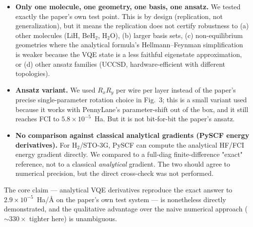 \documentclass[11pt]{article}
\begin{document}
\begin{itemize}
we cannot test on \texttt{default.qubit}. However, our numerical-difference approach still fails on
the noiseless simulator, because the true $\Delta E$ at $r=0.735$~\AA{} is $\sim 10^{-6}$~Ha, below
VQE convergence noise $\sim 5\times10^{-5}$~Ha. So the failure mode we observe (finite-step vs
VQE-convergence tension) is closely related to but not identical to the paper's motivating regime
(finite-step vs shot noise). Both flavors of noise dominate the gradient signal; ours is the
easier-to-simulate stand-in.
\item \textbf{Only one molecule, one geometry, one basis, one ansatz.} We tested exactly the paper's
own test point. This is by design (replication, not generalization), but it means the replication
does not certify robustness to (a) other molecules (LiH, BeH$_2$, H$_2$O), (b) larger basis sets,
(c) non-equilibrium geometries where the analytical formula's Hellmann--Feynman simplification is
weaker because the VQE state is a less faithful eigenstate approximation, or (d) other ansatz
families (UCCSD, hardware-efficient with different topologies).
\item \textbf{Ansatz variant.} We used $R_x R_y$ per wire per layer instead of the paper's precise
single-parameter rotation choice in Fig.~3; this is a small variant used because it works with
PennyLane's parameter-shift out of the box, and it still reaches FCI to $5.8\times10^{-5}$~Ha. But
it is not bit-for-bit the paper's ansatz.
\item \textbf{No comparison against classical analytical gradients (PySCF energy derivatives).}
For H$_2$/STO-3G, PySCF can compute the analytical HF/FCI energy gradient directly. We compared to
a full-diag finite-difference "exact" reference, not to a classical \emph{analytical} gradient. The
two should agree to numerical precision, but the direct cross-check was not performed.
\end{itemize}

The core claim --- analytical VQE derivatives reproduce the exact answer to $2.9\times10^{-5}$~Ha/\AA{}
on the paper's own test system --- is nonetheless directly demonstrated, and the qualitative
advantage over the naive numerical approach ($\sim 330\times$ tighter here) is unambiguous.


\end{document}
